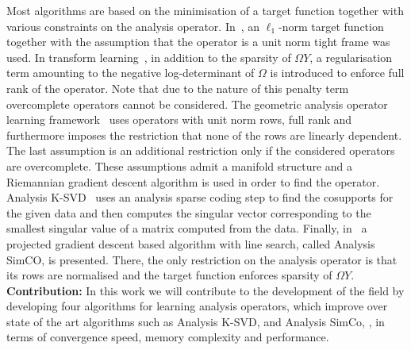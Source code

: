\documentclass[11pt, onecolumn, journal,compsoc]{IEEEtran}
\theoremstyle{plain}
\theoremstyle{remark}
\begin{document}
Most algorithms are based on the minimisation of a target function together with various constraints on the analysis operator. In~\cite{yanagrda11,yanagrda13}, an $\ell_1$-norm target function together with the assumption that the operator is a unit norm tight frame was used. 
In transform learning~\cite{rabr13}, in addition to the sparsity of $\Omega Y$, a regularisation term amounting to the negative log-determinant of $\Omega$ is introduced to enforce full rank of the operator. Note that due to the nature of this penalty term overcomplete operators cannot be considered.
The geometric analysis operator learning framework~\cite{hakldi13} uses operators with unit norm rows, full rank and furthermore imposes the restriction that none of the rows are linearly dependent. The last assumption is an additional restriction only if the considered operators are overcomplete. These assumptions admit a manifold structure and a Riemannian gradient descent algorithm is used in order to find the operator.
Analysis K-SVD~\cite{rupeel13} uses an analysis sparse coding step to find the cosupports for the given data and then computes the singular vector corresponding to the smallest singular value of a matrix computed from the data.
Finally, in~\cite{dowada14,dowadaplha16} a projected gradient descent based algorithm with line search, called Analysis SimCO, is presented. There, the only restriction on the analysis operator is that its rows are normalised and the target function enforces sparsity of $\Omega Y$.\\
{\bf Contribution:} In this work we will contribute to the development of the field by developing four algorithms for learning analysis operators, which  improve over state of the art algorithms such as Analysis K-SVD, \cite{rupeel13} and Analysis SimCo, \cite{dowada14, dowadaplha16}, in terms of convergence speed, memory complexity and performance. \\
\end{document}
